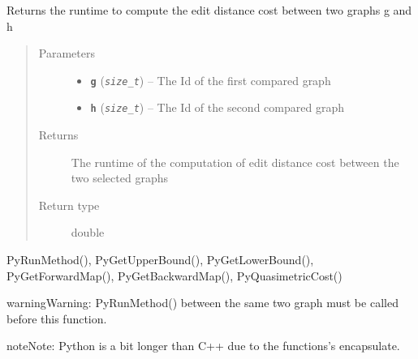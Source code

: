 \documentclass[letterpaper,10pt,english]{sphinxmanual}
\begin{document}
\begin{fulllineitems}
\label{doc:PythonGedLib.PyGetRuntime}
Returns the runtime to compute the edit distance cost between two graphs g and h
\begin{quote}\begin{description}
\item[{Parameters}] \leavevmode\begin{itemize}
\item {} 
\textbf{\texttt{g}} (\emph{\texttt{size\_t}}) -- The Id of the first compared graph

\item {} 
\textbf{\texttt{h}} (\emph{\texttt{size\_t}}) -- The Id of the second compared graph

\end{itemize}

\item[{Returns}] \leavevmode
The runtime of the computation of edit distance cost between the two selected graphs

\item[{Return type}] \leavevmode
double

\end{description}\end{quote}




PyRunMethod(), PyGetUpperBound(), PyGetLowerBound(),  PyGetForwardMap(), PyGetBackwardMap(), PyQuasimetricCost()



\begin{notice}{warning}{Warning:}
PyRunMethod() between the same two graph must be called before this function.
\end{notice}

\begin{notice}{note}{Note:}
Python is a bit longer than C++ due to the functions's encapsulate.
\end{notice}

\end{fulllineitems}

\end{document}
